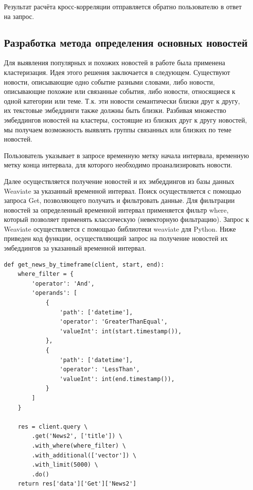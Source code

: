Результат расчёта кросс-корреляции отправляется обратно пользователю в ответ на запрос.

\subsection{Разработка метода определения основных новостей}

Для выявления популярных и похожих новостей в работе была применена кластеризация. Идея этого решения заключается в следующем. Существуют новости, описывающие одно событие разными словами, либо новости, описывающие похожие или связанные события, либо новости, относящиеся к одной категории или теме. Т.к. эти новости семантически близки друг к другу, их текстовые эмбеддинги также должны быть близки. Разбивая множество эмбеддингов новостей на кластеры, состоящие из близких друг к другу новостей, мы получаем возможность выявлять группы связанных или близких по теме новостей.

Пользователь указывает в запросе временную метку начала интервала, временную метку конца интервала, для которого необходимо проанализировать новости.

Далее осуществляется получение новостей и их эмбеддингов из базы данных Weaviate за указанный временной интервал. Поиск осуществляется с помощью запроса Get{}, позволяющего получать и фильтровать данные. Для фильтрации новостей за определенный временной интервал применяется фильтр where, который позволяет применять классическую (невекторную фильтрацию). Запрос к Weaviate осуществляется с помощью библиотеки weaviate для Python. Ниже приведен код функции, осуществляющий запрос на получение новостей их эмбеддингов за указанный временной интервал.

\begin{lstlisting}
def get_news_by_timeframe(client, start, end):
    where_filter = {
        'operator': 'And',
        'operands': [
            {
                'path': ['datetime'],
                'operator': 'GreaterThanEqual',
                'valueInt': int(start.timestamp()),
            },
            {
                'path': ['datetime'],
                'operator': 'LessThan',
                'valueInt': int(end.timestamp()),
            }
        ]
    }

    res = client.query \
        .get('News2', ['title']) \
        .with_where(where_filter) \
        .with_additional(['vector']) \
        .with_limit(5000) \
        .do()
    return res['data']['Get']['News2']
\end{lstlisting}

